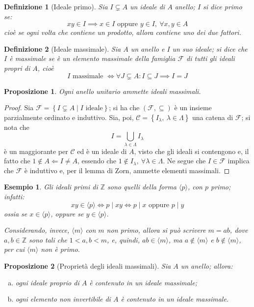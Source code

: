 \documentclass[11pt]{article}
\theoremstyle{style}
\newtheorem{esempio}{Esempio}[section]
\newtheorem{definizione}{Definizione}[section]
\newtheorem{prop}{Proposizione}[section]
\numberwithin{equation}{subsection}
\begin{document}
\begin{definizione}
	[Ideale primo]
	Sia $I \subsetneq A$ un ideale di $A$ anello; $I$ si dice \textit{primo} se:
	\[
	xy \in I \implies x \in I \text{ oppure } y\in I, \ \forall x,y \in A
	\] 
	cio\`e se ogni volta che contiene un prodotto, allora contiene uno dei due fattori.
\end{definizione}
\begin{definizione}
	[Ideale massimale]
	Sia $A$ un anello e $I$ un suo ideale; si dice che $I$ \`e \textit{massimale} se \`e un elemento massimale della famiglia $\mathcal{F} $ di tutti gli ideali propri di $A$, cio\`e
	\[
	I \text{ massimale }\iff\forall J\subsetneq A : I \subseteq J \implies I = J
	\] 
\end{definizione}
\begin{prop}
	Ogni anello unitario ammette ideali massimali.
\end{prop}
	\begin{proof}
		Sia $\mathcal{F} = \left\{ I \subsetneq A  \mid I \text{ ideale} \right\}  $; si ha che $(\mathcal{F} ,\subseteq)$ \`e un insieme parzialmente ordinato e induttivo.
		Sia, poi, $\mathcal{C} = \left\{ I_\lambda , \ \lambda \in \Lambda  \right\} $ una catena di $\mathcal{F} $; si nota che
		\[
		I = \bigcup_{\lambda \in \Lambda } I_\lambda 
		\] 
		\`e un maggiorante per $\mathcal{C} $ ed \`e un ideale di $A$, visto che gli ideali si contengono e, il fatto che $1 \not\in A\Leftarrow I\neq A$, essendo che $1\not \in I_\lambda , \ \forall \lambda \in \Lambda $.
		Ne segue che $I \in \mathcal{F} $ implica che $\mathcal{F} $ \`e induttivo e, per il lemma di Zorn, ammette elementi massimali.
	\end{proof}
\begin{esempio}
Gli ideali primi di $\mathbb{Z}$ sono quelli della forma $\langle p \rangle$, con $p$ primo; infatti:
\[
xy \in \langle p \rangle \iff p  \mid xy \iff p \mid x \text{ oppure }p  \mid y
\] 
ossia se $x \in \langle p \rangle$, oppure se $y \in \langle p \rangle$.

Considerando, invece, $\langle m \rangle$ con $m$ non primo, allora si pu\`o scrivere $m = ab$, dove $a,b \in \mathbb{Z}$ sono tali che $1<a,b<m$, e, quindi, $ab \in \langle m \rangle$, ma $a \not \in \langle m \rangle$ e $b \not \in \langle m \rangle$, per cui $\langle m \rangle$ non \`e primo.
\end{esempio}
\begin{prop}
	[Propriet\`a degli ideali massimali]
	Sia $A$ un anello; allora:
	\begin{enumerate}[(a).]
		\item ogni ideale proprio di $A$ \`e contenuto in un ideale massimale;
		\item ogni elemento non invertibile di $A$ \`e contenuto in un ideale massimale.
	\end{enumerate}
\end{prop}
\end{document}
